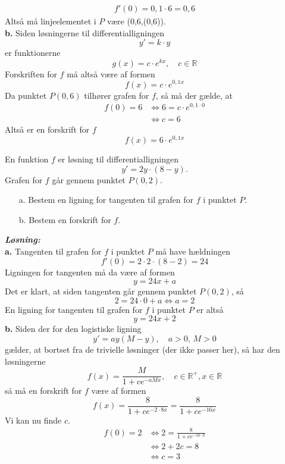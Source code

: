 \documentclass{article}
\newcommand{\sol}{\setlength{\parindent}{0cm}\textbf{\textit{Løsning:}}\setlength{\parindent}{1cm}}
\begin{document}
\begin{equation*}
\begin{split}
  f'(0)=0,1 \cdot 6=0,6
\end{split}
\end{equation*}
Altså må linjeelementet i $P$ være (0,6,(0,6)).\\[1ex]
\textbf{b.}
Siden løsningerne til differentialligningen 
\[
y'=k \cdot y
\] 
er funktionerne
\[
g(x)= c \cdot e^{kx}, \quad c \in \mathbb{R}
\] 
Forskriften for $f$ må altså være af formen
\[
f(x)= c \cdot e^{0,1x} 
\] 
Da punktet $P(0,6)$ tilhører grafen for $f$, så må der gælde, at
\begin{equation*}
\begin{split}
f(0)= 6 &\iff 6=c \cdot e^{0,1 \cdot 0} \\
  &\iff c=6
\end{split}
\end{equation*}
Altså er en forskrift for $f$
\[
f(x)= 6 \cdot e^{0,1x} 
\] 
\begin{question}{}{}
  En funktion $f$ er løsning til differentialligningen
$$y'=2y\cdot(8-y).$$
Grafen for $f$ går gennem punktet $P(0,2).$
\begin{itemize}
  \item[a.] Bestem en ligning for tangenten til grafen for $f$ i punktet $P.$
  \item[b.] Bestem en forskrift for $f.$
\end{itemize}
\end{question}
\sol \\
\textbf{a.}
Tangenten til grafen for $f$ i punktet $P$ må have hældningen
\[
f'(0)=2 \cdot 2 \cdot \left(8-2\right) =24
\] 
Ligningen for tangenten må da være af formen
\[
y=24x+a
\] 
Det er klart, at siden tangenten går gennem punktet $P(0,2)$, så
\[
2=24 \cdot 0 + a \iff a=2
\] 
En ligning for tangenten til grafen for $f$ i punktet $P$ er altså
\[
y=24x+2
\] 
\textbf{b.}
Siden der for den logistiske ligning 
\[
y'=ay(M-y), \quad a>0,\,M>0
\] 
gælder, at bortset fra de trivielle løsninger (der ikke passer her), så har den løsningerne
\[
f(x)= \frac{M}{1+c e^{-aMx} },\quad c \in \mathbb{R}^+, x \in \mathbb{R}
\] 
så må en forskrift for $f$ være af formen
\[
f(x)= \frac{8}{1+c e^{-2 \cdot 8 x}}= \frac{8}{1+ c e^{-16x}}
\] 
Vi kan nu finde $c$.
\begin{equation*}
\begin{split}
  f(0)= 2 &\iff 2=\frac{8}{1+c e^{-16 \cdot 0}}\\
  &\iff 2 + 2c=8\\
  &\iff c=3
\end{split}
\end{equation*}
\end{document}
